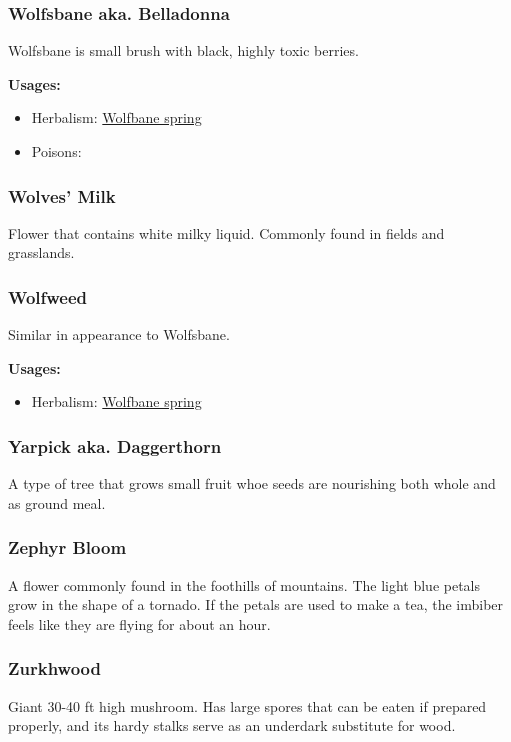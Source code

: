 \subsubsection{Wolfsbane aka. Belladonna}
\label{Wolfsbane}

Wolfsbane is small brush with black, highly toxic berries.

\vspace{5mm}

\textbf{Usages:}

\begin{itemize}[noitemsep]
\item[] Herbalism: \hyperref[Wolfbane spring]{Wolfbane spring}
\item[] Poisons: \poison\poison
\end{itemize}

\subsubsection{Wolves' Milk}

Flower that contains white milky liquid. Commonly found in fields and grasslands.

\subsubsection{Wolfweed}
\label{Wolfweed}

Similar in appearance to Wolfsbane.

\vspace{5mm}

\textbf{Usages:}

\begin{itemize}[noitemsep]
\item[] Herbalism: \hyperref[Wolfbane spring]{Wolfbane spring}
\end{itemize}

\subsubsection{Yarpick aka. Daggerthorn}

A type of tree that grows small fruit whoe seeds are nourishing both whole and as ground meal.

\subsubsection{Zephyr Bloom}
\label{zephyr_bloom}

A flower commonly found in the foothills of mountains. The light blue petals grow in the shape of a tornado. If the petals are used to make a tea, the imbiber feels like they are flying for about an hour.

\subsubsection{Zurkhwood}

Giant 30-40 ft high mushroom. Has large spores that can be eaten if prepared properly, and its hardy stalks serve as an underdark substitute for wood.
